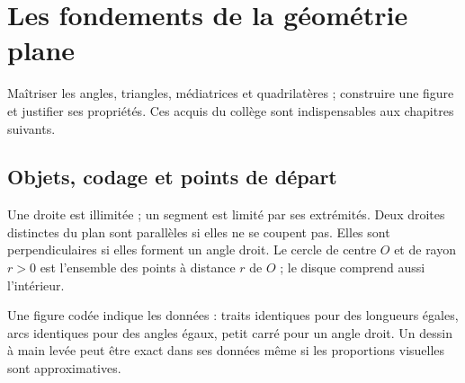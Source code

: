 \documentclass[../cours_3e.tex]{subfiles}
\begin{document}
\setcounter{chapter}{11}
\chapter{Les fondements de la géométrie plane}
\label{ch:geometrie}
\begin{objectif}
Maîtriser les angles, triangles, médiatrices et quadrilatères ; construire une figure et justifier ses propriétés. Ces acquis du collège sont indispensables aux chapitres suivants.
\end{objectif}
\section{Objets, codage et points de départ}
Une droite est illimitée ; un segment est limité par ses extrémités. Deux droites distinctes du plan sont parallèles si elles ne se coupent pas. Elles sont perpendiculaires si elles forment un angle droit. Le cercle de centre $O$ et de rayon $r>0$ est l'ensemble des points à distance $r$ de $O$ ; le disque comprend aussi l'intérieur.

Une figure codée indique les données : traits identiques pour des longueurs égales, arcs identiques pour des angles égaux, petit carré pour un angle droit. Un dessin à main levée peut être exact dans ses données même si les proportions visuelles sont approximatives.

\end{document}

